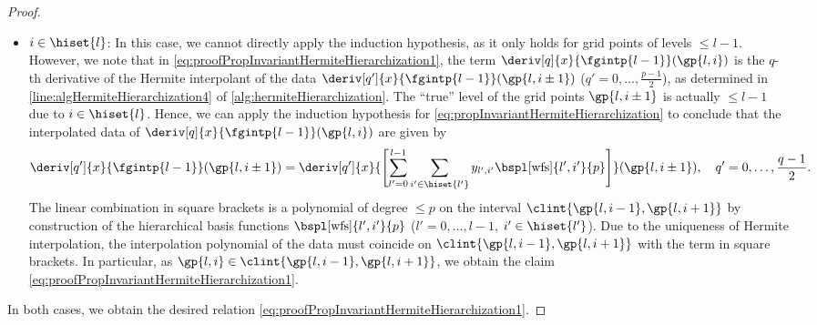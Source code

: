 \begin{proof}
\begin{itemize}
    \item
    ${i \in \hiset{l}}$:
    In this case, we cannot directly apply the induction hypothesis,
    as it only holds for grid points of levels $\le l - 1$.
    However, we note that in
    \eqref{eq:proofPropInvariantHermiteHierarchization1},
    the term $\deriv[q]{x}{\fgintp{l-1}}(\gp{l,i})$
    is the $q$-th derivative of the Hermite interpolant of
    the data $\deriv[q']{x}{\fgintp{l-1}}(\gp{l,i\pm1})$
    ($q' = 0, \dotsc, \frac{p-1}{2}$),
    as determined in \cref{line:algHermiteHierarchization4}
    of \cref{alg:hermiteHierarchization}.
    The ``true'' level of the grid points $\gp{l,i\pm1}$ is
    actually $\le l - 1$ due to $i \in \hiset{l}$.
    Hence, we can apply the induction hypothesis
    for \cref{eq:propInvariantHermiteHierarchization}
    to conclude that the interpolated data of
    $\deriv[q]{x}{\fgintp{l-1}}(\gp{l,i})$ are given by
    \begin{equation}
      \deriv[q']{x}{\fgintp{l-1}}(\gp{l,i\pm1})
      = \deriv[q']{x}{
        \Biggl[\sum_{l'=0}^{l-1} \sum_{i' \in \hiset{l'}}
        \linout{l',i'} \bspl[\wfs]{l',i'}{p}\Biggr]
      }(\gp{l,i\pm1}),\quad
      q' = 0, \dotsc, \frac{q-1}{2}.
    \end{equation}
    The linear combination in square brackets
    is a polynomial of degree $\le p$ on the interval
    $\clint{\gp{l,i-1}, \gp{l,i+1}}$
    by construction of the hierarchical basis functions
    $\bspl[\wfs]{l',i'}{p}$ ($l' = 0, \dotsc, l - 1$, $i' \in \hiset{l'}$).
    Due to the uniqueness of Hermite interpolation,
    the interpolation polynomial of the data must
    coincide on $\clint{\gp{l,i-1}, \gp{l,i+1}}$
    with the term in square brackets.
    In particular, as $\gp{l,i} \in \clint{\gp{l,i-1}, \gp{l,i+1}}$,
    we obtain the claim \eqref{eq:proofPropInvariantHermiteHierarchization1}.
  \end{itemize}
  In both cases, we obtain the desired relation
  \eqref{eq:proofPropInvariantHermiteHierarchization1}.
\end{proof}

